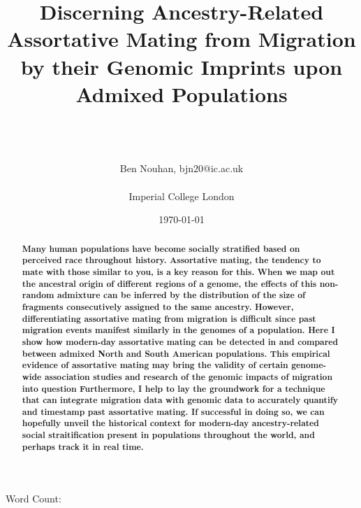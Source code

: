 \documentclass[11pt]{article}
\title{Discerning Ancestry-Related Assortative Mating from Migration by their Genomic Imprints upon Admixed Populations%
}
\author{\\ \\ \\ Ben Nouhan, bjn20@ic.ac.uk \\ \\ Imperial College London \\}
\date{\today}
\newcommand\wordcount{}
\begin{document}
\maketitle
\thispagestyle{empty}

\vspace{4mm}
\centerline{Word Count: \wordcount}

\vspace{8mm}
\onehalfspacing
\renewcommand{\abstractname}{\vspace{-\baselineskip}} %

\begin{abstract}
    \linenumbers
    \small
    \noindent
    \textbf{
        Many human populations have become socially stratified based on perceived race throughout history. Assortative mating, the tendency to mate with those similar to you, is a key reason for this. When we map out the ancestral origin of different regions of a genome, the effects of this non-random admixture can be inferred by the distribution of the size of fragments consecutively assigned to the same ancestry. However, differentiating assortative mating from migration is difficult since past migration events manifest similarly in the genomes of a population. Here I show how modern-day assortative mating can be detected in and compared between admixed North and South American populations. This empirical evidence of assortative mating may bring the validity of certain genome-wide association studies and research of the genomic impacts of migration into question Furthermore, I help to lay the groundwork for a technique that can integrate migration data with genomic data to accurately quantify and timestamp past assortative mating. If successful in doing so, we can hopefully unveil the historical context for modern-day ancestry-related social straitification present in populations throughout the world, and perhaps track it in real time.
    }
\end{abstract}


\newpage
\tableofcontents
\thispagestyle{empty}

\newpage
\linenumbers


\setcounter{page}{3}
\end{document}
